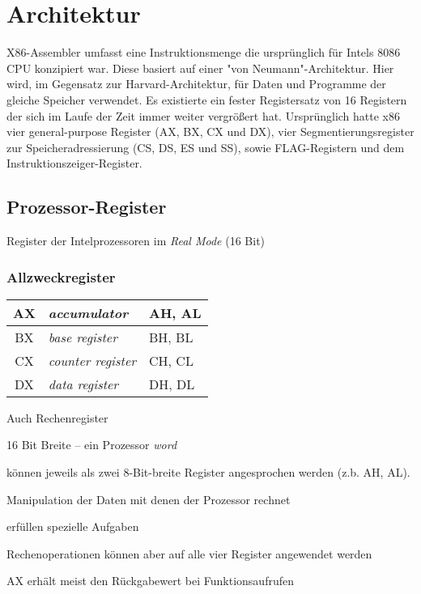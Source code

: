 \section{Architektur}
X86-Assembler umfasst eine Instruktionsmenge die ursprünglich für Intels 8086 CPU konzipiert war. Diese basiert auf einer "von Neumann"-Architektur. Hier wird, im Gegensatz zur Harvard-Architektur, für Daten und Programme der gleiche Speicher verwendet. Es existierte ein fester Registersatz von 16 Registern der sich im Laufe der Zeit immer weiter vergrößert hat. Ursprünglich hatte x86 vier general-purpose Register (AX, BX, CX und DX), vier Segmentierungsregister zur Speicheradressierung (CS, DS, ES und SS), sowie FLAG-Registern und dem Instruktionszeiger-Register.

\subsection{Prozessor-Register}

Register der Intelprozessoren im \emph{Real Mode} (16 Bit)



\subsubsection{Allzweckregister}

\begin{tabular}{|c|l|l|}
\hline AX & \emph{accumulator} & AH, AL
\\
\hline BX & \emph{base register} & BH, BL
\\
\hline CX & \emph{counter register} & CH, CL
\\
\hline DX & \emph{data register} & DH, DL
\\
\hline \end{tabular}

Auch Rechenregister

16 Bit Breite – ein Prozessor \emph{word}

können jeweils als zwei 8-Bit-breite Register angesprochen werden (z.b.                                                                                                                  AH, AL).

Manipulation der Daten mit denen der Prozessor rechnet

erfüllen spezielle Aufgaben

Rechenoperationen können aber auf alle vier Register angewendet werden

AX erhält meist den Rückgabewert bei Funktionsaufrufen



